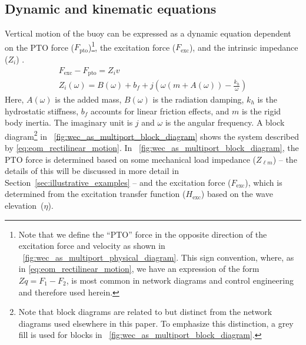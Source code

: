\documentclass[lettersize,journal]{IEEEtran}
\begin{document}
\subsection{Dynamic and kinematic equations}\label{sec:dynamic_and_kinematic_equations}
Vertical motion of the buoy can be expressed as a dynamic equation dependent on the PTO force ($F_{\textrm{pto}}$)\footnote{Note that we define the ``PTO'' force in the opposite direction of the excitation force and velocity as shown in \figurename~\ref{fig:wec_as_multiport_physical_diagram}. This sign convention, where, as in \eqref{eq:eom_rectilinear_motion}, we have an expression of the form $Z q = F_1 - F_2$, is most common in network diagrams and control engineering and therefore used herein.}, the excitation force ($F_{\textrm{exc}}$), and the intrinsic impedance ($Z_i$) \cite{Falnes:2002aa}.
%
\begin{subequations}
\begin{gather}
        F_{\textrm{exc}} - F_{\textrm{pto}} = Z_i v \label{eq:eom_rectilinear_motion} \\
        Z_i(\omega) = B(\omega) + b_f + j \left( \omega \left( m + A(\omega) \right) - \frac{k_{h}}{\omega}\right)
\end{gather}
\end{subequations}
%
\noindent{}Here, $A(\omega)$ is the added mass, $B(\omega)$ is the radiation damping, $k_h$ is the hydrostatic stiffness, $b_f$ accounts for linear friction effects, and $m$ is the rigid body inertia.
The imaginary unit is $j$ and $\omega$ is the angular frequency.
A block diagram\footnote{\label{fn:block_diagrams}Note that block diagrams are related to but distinct from the network diagrams used elsewhere in this paper. To emphasize this distinction, a grey fill is used for blocks in \figurename~\ref{fig:wec_as_multiport_block_diagram}.} in \figurename~\ref{fig:wec_as_multiport_block_diagram} shows the system described by \eqref{eq:eom_rectilinear_motion}.
In \figurename~\ref{fig:wec_as_multiport_block_diagram}, the PTO force is determined based on some mechanical load impedance ($Z_{\ell m}$) -- the details of this will be discussed in more detail in Section~\ref{sec:illustrative_examples} -- and the excitation force ($F_{\textrm{exc}}$), which is determined from the excitation transfer function ($H_{\textrm{exc}}$) based on the wave elevation~($\eta$).
\end{document}
